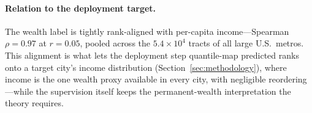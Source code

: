 \paragraph{Relation to the deployment target.}
The wealth label is tightly rank-aligned with per-capita income---Spearman $\rho = 0.97$ at
$r=0.05$, pooled across the $5.4\times10^{4}$ tracts of all large U.S.\ metros. This alignment
is what lets the deployment step quantile-map predicted ranks onto a target city's income
distribution (Section~\ref{sec:methodology}), where income is the one wealth proxy available
in every city, with negligible reordering---while the supervision itself keeps the
permanent-wealth interpretation the theory requires.

%
%
%
